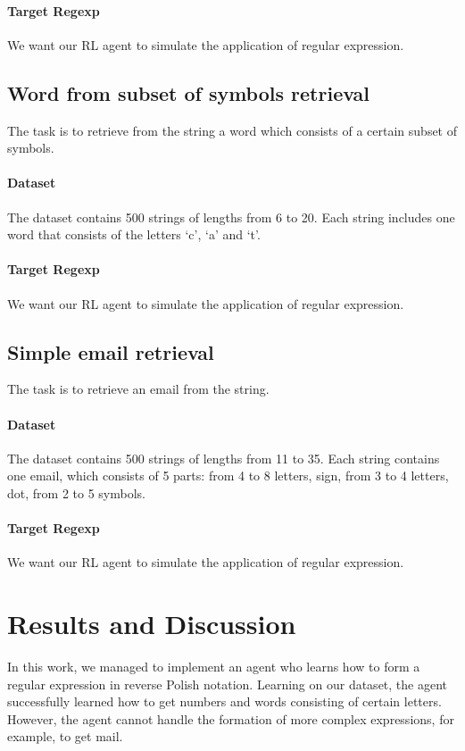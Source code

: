 \documentclass{article}
\begin{document}
\paragraph{Target Regexp}
We want our RL agent to simulate the application of \codeword{\d} regular expression.

\subsection{Word from subset of symbols retrieval}
The task is to retrieve from the string a word which consists of a certain subset of symbols.

\paragraph{Dataset}
The dataset contains 500 strings of lengths from 6 to 20. Each string includes one word that consists of the letters `c', `a' and `t'.

\paragraph{Target Regexp}
We want our RL agent to simulate the application of \codeword{[cat]+} regular expression.

\subsection{Simple email retrieval}
The task is to retrieve an email from the string.

\paragraph{Dataset}
The dataset contains 500 strings of lengths from 11 to 35. Each string contains one email, which consists of 5 parts: from 4 to 8 letters,  sign, from 3 to 4 letters, dot, from 2 to 5 symbols.

\paragraph{Target Regexp}
We want our RL agent to simulate the application of  regular expression.

\section{Results and Discussion}
In this work, we managed to implement an agent who learns how to form a regular expression in reverse Polish notation. Learning on our dataset, the agent successfully learned how to get numbers and words consisting of certain letters. However, the agent cannot handle the formation of more complex expressions, for example, to get mail.
\end{document}
